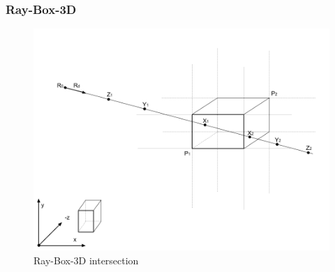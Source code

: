 \subsubsection{Ray-Box-3D}

\begin{figure}[H]
\caption{Ray-Box-3D intersection}
\label{fig:ray-box-3d}
\centering
\includegraphics[width=\linewidth]{Figures/ray-box-3d-intersection.png}
\decoRule
\end{figure}

